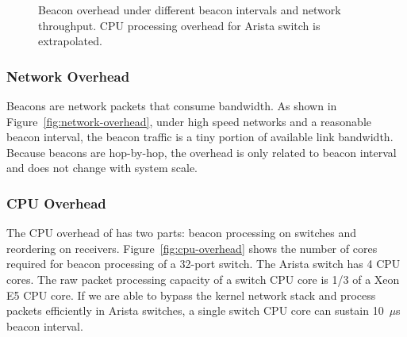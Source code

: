 \begin{figure}[t]
\centering
	\hspace{0.01\textwidth}
\caption{Beacon overhead under different beacon intervals and network throughput. CPU processing overhead for Arista switch is extrapolated.}
\label{fig:overhead}
\end{figure}




\subsubsection{Network Overhead}
\label{sec:eval-overhead}


Beacons are network packets that consume bandwidth.
As shown in Figure~\ref{fig:network-overhead}, under high speed networks and a reasonable beacon interval, the beacon traffic is a tiny portion of available link bandwidth. Because beacons are hop-by-hop, the overhead is only related to beacon interval and does not change with system scale.

\subsubsection{CPU Overhead}
\label{sec:eval-cpu-overhead}

The CPU overhead of \sys has two parts: beacon processing on switches and reordering on receivers.
Figure~\ref{fig:cpu-overhead} shows the number of cores required for beacon processing of a 32-port switch. The Arista switch has 4 CPU cores. The raw packet processing capacity of a switch CPU core is 1/3 of a Xeon E5 CPU core. If we are able to bypass the kernel network stack and process packets efficiently in Arista switches, a single switch CPU core can sustain 10~$\mu$s beacon interval.


